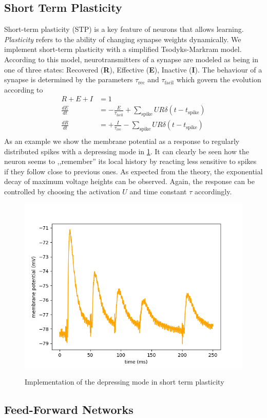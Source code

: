 \documentclass[a4paper,twocolumn]{article}
\begin{document}
\subsection{Short Term Plasticity}
Short-term plasticity (STP) is a key feature of neurons that allows learning.
\textit{Plasticity} refers to the ability of changing synapse weights dynamically.
We implement short-term plasticity with a simplified Tsodyks-Markram model.  According
to this model,  neurotransmitters of a synapse are modeled as being in one of
three states: Recovered (\textbf{R}),  Effective (\textbf{E}),  Inactive
(\textbf{I}).  The behaviour of a synapse is determined by the parameters
$\tau_\text{rec}$ and $\tau_\text{facil}$ which govern the evolution according to
\begin{align*}
	R + E + I &= 1 \\
	\frac{dE}{dt} &= - \frac{E}{\tau_\text{facil}} + \sum_\text{spike} UR\delta(t-t_\text{spike} ) \\
	\frac{dR}{dt} &= + \frac{I}{\tau_\text{rec}} - \sum_\text{spike} UR\delta(t-t_\text{spike} ) \\
\end{align*}
As an example we show the membrane potential as a response to regularly
distributed spikes with a depressing mode in \ref{stp_depress}.  It can clearly be
seen how the neuron seems to ,,remember'' its local history by reacting less sensitive
to spikes if they follow close to previous ones.  As expected from the theory,
the exponential decay of maximum voltage heights can be observed.  Again,  the response
can be controlled by choosing the activation $U$ and time constant $\tau$ accordingly.
\begin{figure}
		\includegraphics[width=.5\textwidth]{figures/stp_depressing.png}
		\label{stp_depress}
		\caption{Implementation of the depressing mode in short term plasticity}
\end{figure}

\subsection{Feed-Forward Networks}
\label{sec:feed-forward}
\end{document}
